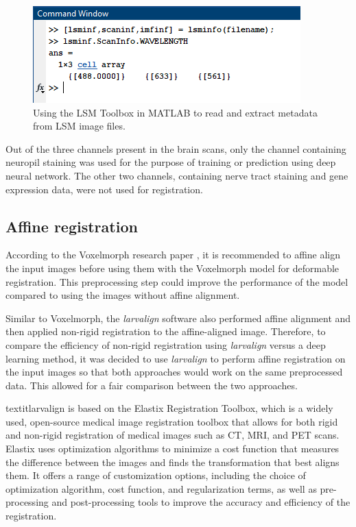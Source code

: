\documentclass{book}
\begin{document}
	\begin{figure}[h!]
		\includegraphics[width=0.5\columnwidth]{resources/chapter4/lsmtoolbox.png}
		\caption{Using the LSM Toolbox in MATLAB to read and extract metadata from LSM image files.}
		\label{fig:lsmtoolbox}
	\end{figure}

	Out of the three channels present in the brain scans, only the channel containing neuropil staining was used for the purpose of training or prediction using deep neural network. The other two channels, containing nerve tract staining and gene expression data, were not used for registration.
	
	\subsection{Affine registration}
	According to the Voxelmorph research paper \cite{Balakrishnan_2019}, it is recommended to affine align the input images before using them with the Voxelmorph model for deformable registration. This preprocessing step could improve the performance of the model compared to using the images without affine alignment.
	
	Similar to Voxelmorph, the \textit{larvalign} \cite{larvalign} software also performed affine alignment and then applied non-rigid registration to the affine-aligned image. Therefore, to compare the efficiency of non-rigid registration using \textit{larvalign} versus a deep learning method, it was decided to use \textit{larvalign} to perform affine registration on the input images so that both approaches would work on the same preprocessed data. This allowed for a fair comparison between the two approaches.
	
	\begin{tcolorbox}[colback=rwth-blue-5,colframe=rwth-blue-1,title=\textbf{\textit{larvalign} Software}]
		textit{larvalign} is based on the Elastix Registration Toolbox, which is a widely used, open-source medical image registration toolbox that allows for both rigid and non-rigid registration of medical images such as CT, MRI, and PET scans.
		\tcblower
		Elastix uses optimization algorithms to minimize a cost function that measures the difference between the images and finds the transformation that best aligns them. It offers a range of customization options, including the choice of optimization algorithm, cost function, and regularization terms, as well as pre-processing and post-processing tools to improve the accuracy and efficiency of the registration.
	\end{tcolorbox}
	
\end{document}
